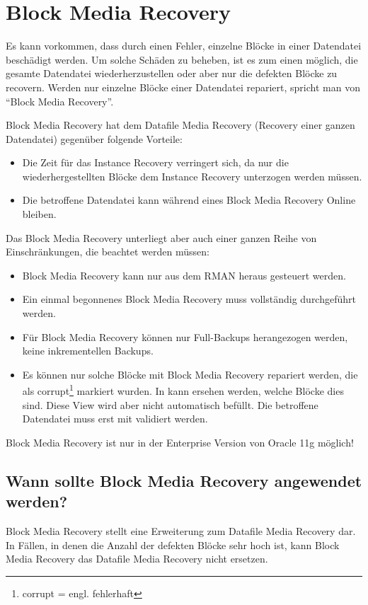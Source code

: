     \section{Block Media Recovery}
      Es kann vorkommen, dass durch einen Fehler, einzelne Bl\"ocke in einer Datendatei besch\"a\-digt werden. Um solche Sch\"aden zu beheben, ist es zum einen m\"oglich, die gesamte Datendatei wiederherzustellen oder aber nur die defekten Bl\"ocke zu recovern. Werden nur einzelne Bl\"ocke einer Datendatei repariert, spricht man von \enquote{Block Media Recovery}.

      Block Media Recovery hat dem Datafile Media Recovery (Recovery einer
      ganzen Datendatei) gegen\"uber folgende Vorteile:
      \begin{itemize}
        \item Die Zeit f\"ur das Instance Recovery verringert sich, da nur die wiederhergestellten Bl\"ocke dem Instance Recovery unterzogen werden m\"ussen.
        \item Die betroffene Datendatei kann w\"ahrend eines Block Media Recovery Online bleiben.
      \end{itemize}
      Das Block Media Recovery unterliegt aber auch einer ganzen Reihe von
      Einschränkungen, die beachtet werden müssen:
      \begin{itemize}
        \item Block Media Recovery kann nur aus dem RMAN heraus gesteuert werden.
        \item Ein einmal begonnenes Block Media Recovery muss vollst\"andig durchgef\"uhrt werden.
				\item F\"ur Block Media Recovery k\"onnen nur Full-Backups herangezogen werden, keine inkrementellen Backups.
        \item Es k\"onnen nur solche Bl\"ocke mit Block Media Recovery repariert werden, die als corrupt\footnote{corrupt = engl. fehlerhaft} markiert wurden. In  kann ersehen werden, welche Bl\"ocke dies sind. Diese View wird aber nicht automatisch bef\"ullt. Die betroffene Datendatei muss erst mit  validiert werden.
      \end{itemize}
      \begin{merke}
        Block Media Recovery ist nur in der Enterprise Version von Oracle 11g m\"oglich!
      \end{merke}
      \subsection{Wann sollte Block Media Recovery angewendet werden?}
        Block Media Recovery stellt eine Erweiterung zum Datafile Media Recovery dar. In F\"allen, in denen die Anzahl der defekten Bl\"ocke sehr hoch ist, kann Block Media Recovery das Datafile Media Recovery nicht ersetzen.

